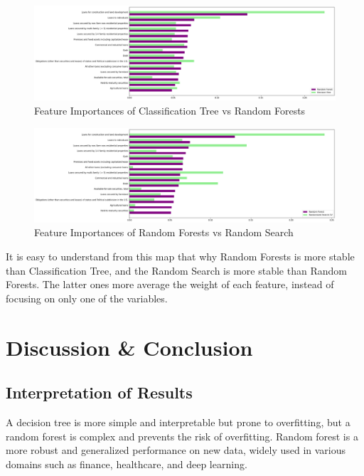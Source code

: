\documentclass[11pt]{report}
\begin{document}
\begin{figure}[h]
     \centering
     \includegraphics[width = \linewidth]{cf_rf_fi.png}
     \caption{Feature Importances of Classification Tree vs Random Forests}\label{fig:cf_rf_fi}
\end{figure}

\begin{figure}[h]
     \centering
     \includegraphics[width = \linewidth]{rf_rs_fi.png}
     \caption{Feature Importances of Random Forests vs Random Search}\label{fig:rf_rs_fi}
\end{figure}

It is easy to understand from this map that why Random Forests is more stable than Classification Tree, and the Random Search is more stable than Random Forests. The latter ones more average the weight of each feature, instead of focusing on only one of the variables.

\section{Discussion \& Conclusion}


\subsection{Interpretation of Results}
A decision tree is more simple and interpretable but prone to overfitting, but a random forest is complex and prevents the risk of overfitting.
Random forest is a more robust and generalized performance on new data, widely used in various domains such as finance, healthcare, and deep learning.
\end{document}
